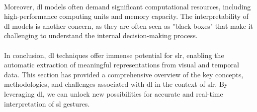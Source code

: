 \paragraph{}
Moreover, \ac{dl} models often demand significant computational resources, including high-performance computing units and memory capacity. The interpretability of \ac{dl} models is another concern, as they are often seen as "black boxes" that make it challenging to understand the internal decision-making process.
\paragraph{}
In conclusion, \ac{dl} techniques offer immense potential for \ac{slr}, enabling the automatic extraction of meaningful representations from visual and temporal data. This section has provided a comprehensive overview of the key concepts, methodologies, and challenges associated with \ac{dl} in the context of \ac{slr}. By leveraging \ac{dl}, we can unlock new possibilities for accurate and real-time interpretation of \ac{sl} gestures.